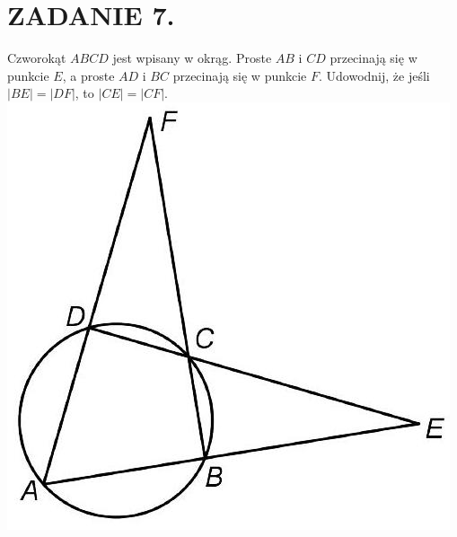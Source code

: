 \documentclass[10pt]{article}
\begin{document}
\section*{ZADANIE 7.}
Czworokąt \(A B C D\) jest wpisany w okrąg. Proste \(A B\) i \(C D\) przecinają się w punkcie \(E\), a proste \(A D\) i \(B C\) przecinają się w punkcie \(F\). Udowodnij, że jeśli \(|B E|=|D F|\), to \(|C E|=|C F|\).\\
\includegraphics[max width=\textwidth, center]{2024_11_21_5f95dfee814a2786343ag-1}
\end{document}
